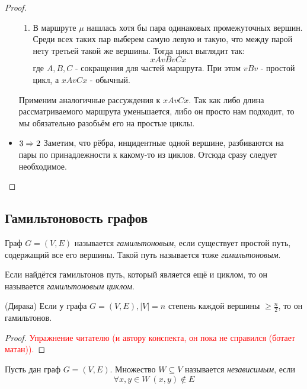 \begin{proof}
\begin{itemize}
\begin{enumerate}
			\item В маршруте $\mu$ нашлась хотя бы пара одинаковых промежуточных вершин. Среди всех таких пар выберем самую левую и такую, что между парой нету третьей такой же вершины. Тогда цикл выглядит так:
			\[
				xAvBvCx
			\]
			где $A, B, C$ - сокращения для частей маршрута. При этом $vBv$ - простой цикл, а $xAvCx$ - обычный.
		\end{enumerate}
		Применим аналогичные рассуждения к $xAvCx$. Так как либо длина рассматриваемого маршрута уменьшается, либо он просто нам подходит, то мы обязательно разобьём его на простые циклы.
		
		\item $3 \Rightarrow 2$ Заметим, что рёбра, инцидентные одной вершине, разбиваются на пары по принадлежности к какому-то из циклов. Отсюда сразу следует необходимое.
	\end{itemize}
\end{proof}

\subsection{Гамильтоновость графов}

\begin{definition}
	Граф $G = (V, E)$ называется \textit{гамильтоновым}, если существует простой путь, содержащий все его вершины. Такой путь называется тоже \textit{гамильтоновым}.
\end{definition}

\begin{definition}
	Если найдётся гамильтонов путь, который является ещё и циклом, то он называется \textit{гамильтоновым циклом}.
\end{definition}

\begin{theorem} (Дирака)
	Если у графа $G = (V, E), |V| = n$ степень каждой вершины $\ge \frac{n}{2}$, то он гамильтонов.
\end{theorem}

\begin{proof}
	\textcolor{red}{Упражнение читателю (и автору конспекта, он пока не справился (ботает матан)).}
\end{proof}

\begin{definition}
	Пусть дан граф $G = (V, E)$. Множество $W \subseteq V$ называется \textit{независимым}, если
	\[
		\forall x, y \in W\ (x, y) \notin E
	\]
\end{definition}

